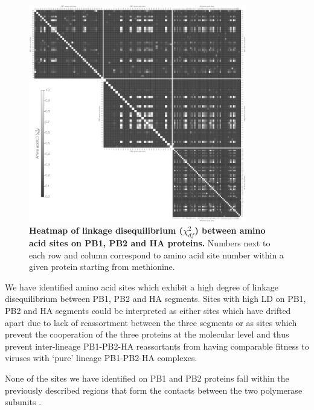 \documentclass[11pt,oneside,letterpaper]{article}
\begin{document}
\begin{figure}
\centering  
\includegraphics[width=0.85\textwidth]  {supp_figures/aaChi_PB1_PB2_HA.png}
\caption{\textbf{Heatmap of linkage disequilibrium ($\chi^{2}_{df}$) between amino acid sites on PB1, PB2 and HA proteins.}
Numbers next to each row and column correspond to amino acid site number within a given protein starting from methionine.}
\label{ChiCore}
\end{figure}

We have identified amino acid sites which exhibit a high degree of linkage disequilibrium between PB1, PB2 and HA segments.
Sites with high LD on PB1, PB2 and HA segments could be interpreted as either sites which have drifted apart due to lack of reassortment between the three segments or as sites which prevent the cooperation of the three proteins at the molecular level and thus prevent inter-lineage PB1-PB2-HA reassortants from having comparable fitness to viruses with `pure' lineage PB1-PB2-HA complexes.

None of the sites we have identified on PB1 and PB2 proteins fall within the previously described regions that form the contacts between the two polymerase subunits \cite{sugiyama2009}.
\end{document}
